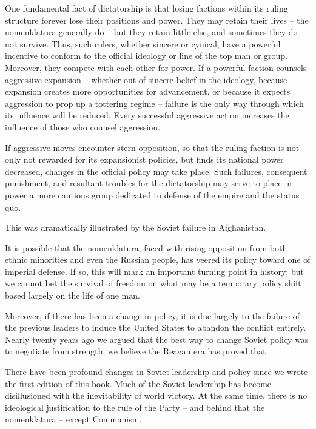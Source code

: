 One fundamental fact of dictatorship is that losing factions within its ruling structure forever lose their positions and power. They may retain their lives -- the nomenklatura generally do -- but they retain little else, and sometimes they do not survive. Thus, such rulers, whether sincere or cynical, have a powerful incentive to conform to the official ideology or line of the top man or group. Moreover, they compete with each other for power. If a powerful faction counsels aggressive expansion -- whether out of sincere belief in the ideology, because expansion creates more opportunities for advancement, or because it expects aggression to prop up a tottering regime -- failure is the only way through which its influence will be reduced. Every successful aggressive action increases the influence of those who counsel aggression.

If aggressive moves encounter stern opposition, so that the ruling faction is not only not rewarded for its expansionist policies, but finds its national power decreased, changes in the official policy may take place. Such failures, consequent punishment, and resultant troubles for the dictatorship may serve to place in power a more cautious group dedicated to defense of the empire and the status quo.

\begin{mdframed}[backgroundcolor=black!10]
This was dramatically illustrated by the Soviet failure in Afghanistan.
\end{mdframed}

It is possible that the nomenklatura, faced with rising opposition from both ethnic minorities and even the Russian people, has veered its policy toward one of imperial defense. If so, this will mark an important turning point in history; but we cannot bet the survival of freedom on what may be a temporary policy shift based largely on the life of one man.

Moreover, if there has been a change in policy, it is due largely to the failure of the previous leaders to induce the United States to abandon the conflict entirely. Nearly twenty years ago we argued that the best way to change Soviet policy was to negotiate from strength; we believe the Reagan era has proved that.

There have been profound changes in Soviet leadership and policy since we wrote the first edition of this book. Much of the Soviet leadership has become disillusioned with the inevitability of world victory. At the same time, there is no ideological justification to the rule of the Party -- and behind that the nomenklatura -- except Communism.

